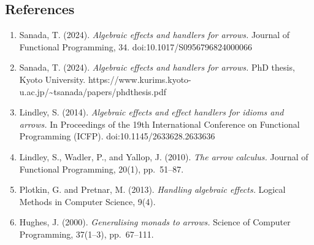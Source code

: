 \documentclass[
  11pt,
]{article}
\providecommand{\tightlist}{%
  \setlength{\itemsep}{0pt}\setlength{\parskip}{0pt}}
\begin{document}
\subsection{References}\label{references}

\begin{enumerate}
\def\labelenumi{\arabic{enumi}.}
\tightlist
\item
  Sanada, T. (2024). \emph{Algebraic effects and handlers for arrows.}
  Journal of Functional Programming, 34. doi:10.1017/S0956796824000066
\item
  Sanada, T. (2024). \emph{Algebraic effects and handlers for arrows.}
  PhD thesis, Kyoto University.
  https://www.kurims.kyoto-u.ac.jp/\textasciitilde tsanada/papers/phdthesis.pdf
\item
  Lindley, S. (2014). \emph{Algebraic effects and effect handlers for
  idioms and arrows.} In Proceedings of the 19th International
  Conference on Functional Programming (ICFP).
  doi:10.1145/2633628.2633636
\item
  Lindley, S., Wadler, P., and Yallop, J. (2010). \emph{The arrow
  calculus.} Journal of Functional Programming, 20(1), pp.~51--87.
\item
  Plotkin, G. and Pretnar, M. (2013). \emph{Handling algebraic effects.}
  Logical Methods in Computer Science, 9(4).
\item
  Hughes, J. (2000). \emph{Generalising monads to arrows.} Science of
  Computer Programming, 37(1--3), pp.~67--111.
\end{enumerate}
\end{document}
